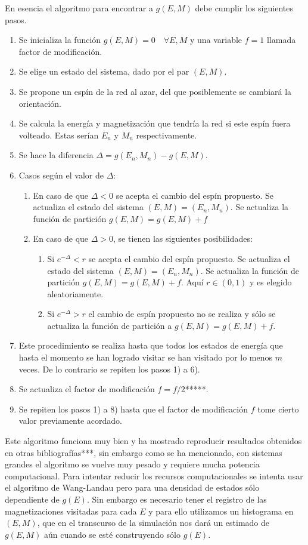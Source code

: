 \documentclass[12pt]{book}
\begin{document}
En esencia el algoritmo para encontrar a $g(E,M)$ debe cumplir los siguientes pasos.
\begin{enumerate}
	\item Se inicializa la función $g(E,M)=0 \quad \forall E, M$ y una variable $f=1$ llamada factor de modificación. 
	\item Se elige un estado del sistema, dado por el par $(E,M)$.
	\item Se propone un espín de la red al azar, del que posiblemente se cambiará la orientación.
	\item Se calcula la energía y magnetización que tendría la red si este espín fuera volteado. Estas serían $E_{n}$ y $M_{n}$ respectivamente.
	\item Se hace la diferencia $\Delta = g(E_{n},M_{n})-g(E,M)$.
	\item Casos según el valor de $\Delta$:
	\begin{enumerate}
		\item En caso de que $\Delta<0$ se acepta el cambio del espín propuesto. Se actualiza el estado del sistema $(E,M)=(E_{n},M_{n})$. Se actualiza la función de partición $g(E,M)=g(E,M)+f$
		\item En caso de que $\Delta>0$, se tienen las siguientes posibilidades:
		\begin{enumerate}
			\item Si $e^{-\Delta}<r$ se acepta el cambio del espín propuesto. Se actualiza el estado del sistema $(E,M)=(E_{n},M_{n})$. Se actualiza la función de partición $g(E,M)=g(E,M)+f$. Aquí $r\in (0,1)$ y es elegido aleatoriamente.
			\item Si $e^{-\Delta}>r$ el cambio de espín propuesto no se realiza y sólo se actualiza la función de partición a $g(E,M)=g(E,M)+f$.
		\end{enumerate}
	\end{enumerate}
	\item Este procedimiento se realiza hasta que todos los estados de energía que hasta el momento se han logrado visitar se han visitado por lo menos $m$ veces. De lo contrario se repiten los pasos 1) a 6).
	\item Se actualiza el factor de modificación $f=f/2$*****.
	\item Se repiten los pasos 1) a 8) hasta que el factor de modificación $f$ tome cierto valor previamente acordado.
\end{enumerate}


Este algoritmo funciona muy bien y ha mostrado reproducir resultados obtenidos en otras bibliografías***, sin embargo como se ha mencionado, con sistemas grandes el algoritmo se vuelve muy pesado y requiere mucha potencia computacional.
Para intentar reducir los recursos computacionales se intenta usar el algoritmo de Wang-Landau pero para una densidad de estados sólo dependiente de $g(E)$. Sin embargo es necesario tener el registro de las magnetizaciones visitadas para cada $E$ y para ello utilizamos un histograma en $(E,M)$, que en el transcurso de la simulación nos dará un estimado de $g(E,M)$ aún cuando se esté construyendo sólo $g(E)$.
\\
\end{document}

